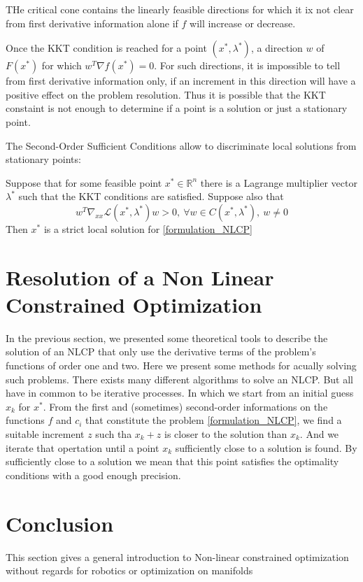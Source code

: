 THe critical cone contains the linearly feasible directions for which it ix not clear from first derivative information alone if $f$ will increase or decrease.

Once the KKT condition is reached for a point $(x^*, \lambda^*)$, a direction $w$ of $F(x^*)$ for which $w^T\nabla f(x^*)=0$.
For such directions, it is impossible to tell from first derivative information only, if an increment in this direction will have a positive effect on the problem resolution.
Thus it is possible that the KKT constaint is not enough to determine if a point is a solution or just a stationary point.

The Second-Order Sufficient Conditions allow to discriminate local solutions from stationary points:

\begin{theorem}
  Suppose that for some feasible point $x^*\in \mathbb{R}^n$ there is a Lagrange multiplier vector $\lambda^*$ such that the KKT conditions are satisfied. Suppose also that
  \begin{equation}
    w^T\nabla_{xx}\mathcal{L}(x^*,\lambda^*)w>0,\ \forall w\in C(x^*,\lambda^*),\ w\neq 0
  \end{equation}
  Then $x^*$ is a strict local solution for \ref{formulation_NLCP}
\end{theorem}

\section{Resolution of a Non Linear Constrained Optimization}

In the previous section, we presented some theoretical tools to describe the solution of an NLCP that only use the derivative terms of the problem's functions of order one and two.
Here we present some methods for acually solving such problems.
There exists many different algorithms to solve an NLCP.
But all have in common to be iterative processes.
In which we start from an initial guess $x_k$ for $x^*$.
From the first and (sometimes) second-order informations on the functions $f$ and $c_i$ that constitute the problem \ref{formulation_NLCP}, we find a suitable increment $z$ such tha $x_k+z$ is closer to the solution than $x_k$.
And we iterate that opertation until a point $x_k$ sufficiently close to a solution is found.
By sufficiently close to a solution we mean that this point satisfies the optimality conditions with a good enough precision.



\section{Conclusion}
This section gives a general introduction to Non-linear constrained optimization without regards for robotics or optimization on manifolds

